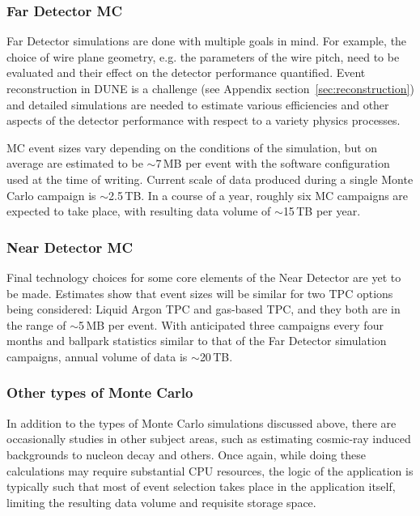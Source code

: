 \subsubsection{Far Detector MC}
Far Detector simulations are done with multiple goals in mind. For example, the choice of wire plane geometry, e.g. the parameters of the wire
pitch, need to be evaluated and their effect on the detector performance quantified. Event reconstruction in DUNE is a challenge (see
Appendix section~\ref{sec:reconstruction}) and detailed simulations are needed to estimate various efficiencies and other aspects
of the detector performance with respect to a variety physics processes.

MC event sizes vary depending on the conditions of the simulation, but on average are estimated to be $\sim$7\,MB per event
with the software configuration used at the time of writing. Current scale of data produced during a single Monte Carlo
campaign is $\sim$2.5\,TB. In a course of a year, roughly six MC campaigns are expected to take place, with resulting data volume of $\sim$15\,TB per year.

\subsubsection{Near Detector MC}
Final technology choices for some core elements of the Near Detector are yet to be made. Estimates show that event sizes will be similar
for two TPC options being considered: Liquid Argon TPC and gas-based TPC, and they both are in the range of $\sim$5\,MB per event.
With anticipated three campaigns every four months and ballpark statistics similar to that of the Far Detector simulation campaigns,
annual volume of data is $\sim$20\,TB.

\subsubsection{Other types of Monte Carlo}
In addition to the types of Monte Carlo simulations discussed above, there are occasionally studies in other subject areas,
such as estimating cosmic-ray induced backgrounds to nucleon decay and others. Once again, while doing these calculations
may require substantial CPU resources, the logic of the application is typically such that most of event selection takes place
in the application itself, limiting the resulting data volume and requisite storage space. 


